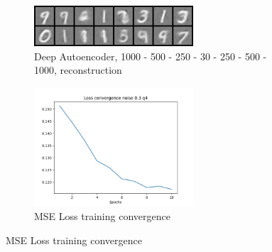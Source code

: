 \begin{figure}[!htbp]
          \begin{subfigure}
          \centering
          \includegraphics[angle=0,width=0.65\textwidth]{assign-4/logs/q4/deep_autoencoder_noise_0.3/image_5.png}
          \caption{Deep Autoencoder, 1000 - 500 - 250 - 30 - 250 - 500 - 1000, reconstruction}
          \end{subfigure}
          \begin{subfigure}
          \centering
          \includegraphics[angle=0,width=0.65\textwidth]{assign-4/logs/q4/convergence-noise-0.3.png}
          \caption{MSE Loss training convergence}
          \end{subfigure}
          \end{figure}
          
